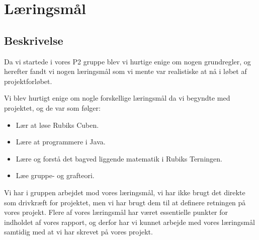 \section{L\ae{}ringsm\aa{}l}

\begin{comment}
Hvordan har i arbejdet med l\ae{}ringsm\aa{}l i gruppen?
Hvordan har i fulgt op p\aa{} de l\ae{}ringsm\aa{}l der blev defineret i gruppen? Har i n\aa{}et m\aa{}lene?
Hvordan l\ae{}rer du bedst, via individuelt arbejde -- gruppediskussion -- forel\ae{}sning etc.?
Hvordan har I brugt resultaterne af jeres individuelle l\ae{}ringsstilstest?
Hvilken l\ae{}ringsstrategi er efter jeres mening bedst i forbindelse med kurser? Hvorfor?
Hvordan hj\ae{}lper I hinanden med at l\o{}se opgaver i kurserne?
Hvad g\o{}r I hvis I ikke forst\aa{}r en forel\ae{}ser eller det der st\aa{}r i bogen?
Hvilken l\ae{}ringsstrategi er efter jeres mening bedst i forbindelse med projektarbejdet? Hvorfor
Hvordan stimulerer og fremmer jeres vejledere jeres l\ae{}reprocesser?
\end{comment}

\subsection{Beskrivelse}
Da vi startede i vores P2 gruppe blev vi hurtige enige om nogen grundregler, og herefter fandt vi nogen l\ae{}ringsm\aa{}l som vi mente var realistiske at n\aa{} i l\o{}bet af projektforl\o{}bet.

Vi blev hurtigt enige om nogle forskellige l\ae{}ringsm\aa{}l da vi begyndte med projektet, og de var som f\o{}lger:

\begin{itemize}
\item L\ae{}r at l\o{}se Rubiks Cuben.
\item L\ae{}re at programmere i Java.
\item L\ae{}re  og forst\aa{} det bagved liggende matematik i Rubiks Terningen. 
\item L\ae{}e gruppe- og grafteori.
\end{itemize}

Vi har i gruppen arbejdet mod vores l\ae{}ringsm\aa{}l, vi har ikke brugt det direkte som drivkr\ae{}ft for projektet, men vi har brugt dem til at definere retningen p\aa{} vores projekt.
Flere af vores l\ae{}ringsm\aa{}l har v\ae{}ret essentielle punkter for indholdet af vores rapport, og derfor har vi kunnet arbejde med vores l\ae{}ringsm\aa{}l samtidig med at vi har skrevet p\aa{} vores projekt.

